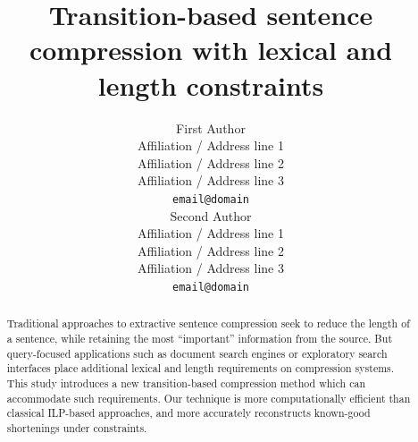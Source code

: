 \documentclass[11pt,a4paper]{article}
\title{Transition-based sentence compression with lexical and length constraints}
\author{First Author \\
  Affiliation / Address line 1 \\
  Affiliation / Address line 2 \\
  Affiliation / Address line 3 \\
  {\tt email@domain} \\\And
  Second Author \\
  Affiliation / Address line 1 \\
  Affiliation / Address line 2 \\
  Affiliation / Address line 3 \\
  {\tt email@domain} \\}
\date{}
\newcommand{\ahcomment}[1]{\textcolor{blue}{[#1 -AH]}}
\begin{document}
\maketitle




\begin{abstract}
Traditional approaches to extractive sentence compression seek to reduce the length of a sentence, while retaining the most ``important'' information from the source. But query-focused applications such as document search engines or exploratory search interfaces place additional lexical and length requirements on compression systems. This study introduces a new transition-based compression method which can accommodate such requirements.  Our technique is more computationally efficient than classical ILP-based approaches, and more accurately reconstructs known-good shortenings under constraints. 
\end{abstract}




\end{document}
